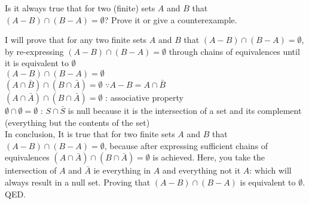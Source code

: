 \documentclass[solution,letterpaper]{cs20}
\begin{document}
    \begin{problem}
        Is it always true that for two (finite) sets $A$ and $B$ that  $(A - B) \cap (B - A) = \emptyset$?
        Prove it or give a counterexample.


        \begin{solution}
            I will prove that for any two finite sets $A$ and $B$ that  $(A - B) \cap (B - A) = \emptyset$, by re-expressing $(A - B) \cap (B - A) = \emptyset$ through chains of equivalences until it is equivalent to $\emptyset$ \\

            $(A - B) \cap (B - A) = \emptyset$ \\
            $(A \cap \bar{B}) \cap (B \cap \bar{A}) = \emptyset$  $ \because A - B = A \cap \bar{B}$ \\
            $(A \cap \bar{A}) \cap (B \cap \bar{A}) = \emptyset$ : associative property \\
            $\emptyset \cap \emptyset = \emptyset$ : $S \cap \bar{S}$ is null because it is the intersection of a set and its complement (everything but the contents of the set) \\

            In conclusion, It is true that for two finite sets $A$ and $B$ that  $(A - B) \cap (B - A) = \emptyset$, because after expressing sufficient chains of equivalences $(A \cap \bar{A}) \cap (B \cap \bar{A}) = \emptyset$ is achieved. Here, you take the intersection of $A$ and $\bar{A}$ ie everything in $A$ and everything not it $A$: which will always result in a null set. Proving that $(A - B) \cap (B - A)$ is equivalent to $\emptyset$. QED.
        \end{solution}
    \end{problem}
    \newpage
\end{document}
